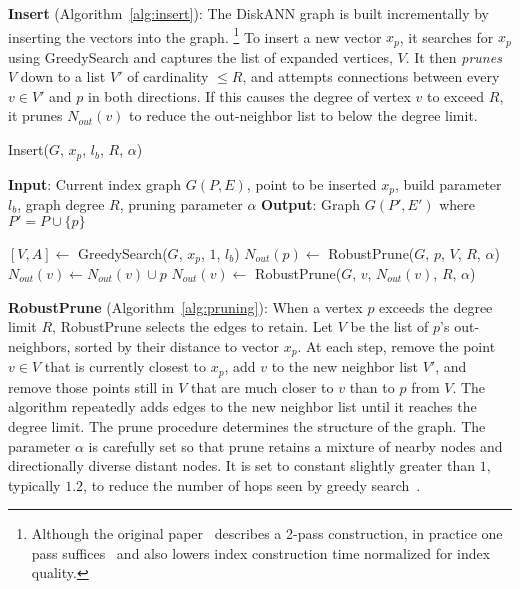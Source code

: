 \textsf{{\bf Insert} (Algorithm~\ref{alg:insert}):}
The DiskANN graph is built incrementally by inserting the vectors into the graph.
\footnote{Although the original paper~\cite{DiskANN19} describes a 2-pass construction,
in practice one pass suffices~\cite{diskann-github} and also lowers index construction
time normalized for index quality.}
To insert a new vector $x_p$, it searches for $x_p$ using \textsf{GreedySearch} 
and captures the list of expanded vertices, $V$.
It then \emph{prunes} $V$ down to a list $V'$ of cardinality $\leq R$,
and attempts connections between every $v\in V'$ and $p$ in both directions. 
If this causes the degree of vertex $v$ to exceed $R$, it prunes $N_{out}(v)$
to reduce the out-neighbor list to below the degree limit. 

\begin{algorithm}
\caption{Insert($G$, $x_p$,  $l_b$, $R$, $\alpha$)}
\label{alg:insert}
\begin{algorithmic}[1]
\State \textbf{Input}: Current index graph $G(P,E)$, point to be inserted $x_p$, build parameter $l_b$, graph degree $R$, pruning parameter $\alpha$
\State \textbf{Output}: Graph $G(P',E')$ where $P'=P\cup \{p\}$

\State $[V,A]\gets$ \textsf{GreedySearch}($G$, $x_p$, $1$, $l_b$)
\State $N_{out}(p)\gets$ \textsf{RobustPrune}($G$, $p$, $V$, $R$, $\alpha$)
\State $N_{out}(v)\gets N_{out}(v)\cup {p}$
\State $N_{out}(v)\gets$ \textsf{RobustPrune}($G$, $v$, $N_{out}(v)$, $R$, $\alpha$)
\EndIf
\EndFor

\end{algorithmic}
\end{algorithm}

\textsf{{\bf RobustPrune} (Algorithm~\ref{alg:pruning}): }
When a vertex $p$ exceeds the degree limit $R$, \textsf{RobustPrune} selects the edges to retain. 
Let $V$ be the  list of $p$'s out-neighbors, sorted by their distance to vector $x_p$. 
At each step, remove the point $v\in V$ that is currently closest to $x_p$,
add $v$ to the new neighbor list $V'$, and remove those points still in $V$  that
are much closer to $v$ than to $p$ from $V$. 
The algorithm repeatedly adds edges to the new neighbor list until it reaches the degree limit.
The prune procedure determines the structure of the graph.
The parameter $\alpha$
is carefully set so that prune retains a mixture of nearby nodes and directionally diverse distant nodes.
It is set to constant slightly greater than $1$, typically $1.2$,
to reduce the number of hops seen by greedy search~\cite{DiskANN19}.

